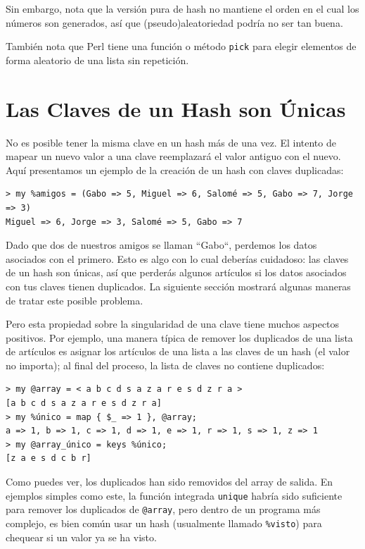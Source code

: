 Sin embargo, nota que la versión pura de hash no mantiene el orden
en el cual los números son generados, así que (pseudo)aleatoriedad
podría no ser tan buena.

También nota que Perl tiene una función o método {\tt pick}
para elegir elementos de forma aleatorio de una lista sin 
repetición.


\section{Las Claves de un Hash son Únicas}

No es posible tener la misma clave en un hash más de una vez.
El intento de mapear un nuevo valor a una clave reemplazará el
valor antiguo con el nuevo. Aquí presentamos un ejemplo de la
creación de un hash con claves duplicadas:

\begin{lstlisting}
> my %amigos = (Gabo => 5, Miguel => 6, Salomé => 5, Gabo => 7, Jorge => 3)
Miguel => 6, Jorge => 3, Salomé => 5, Gabo => 7
\end{lstlisting}

Dado que dos de nuestros amigos se llaman ``Gabo``,  perdemos los
datos asociados con el primero. Esto es algo con lo cual deberías
cuidadoso: las claves de un hash son únicas, así que perderás algunos
artículos si los datos asociados con tus claves tienen duplicados. 
La siguiente sección mostrará algunas maneras de tratar este posible 
problema.

Pero esta propiedad sobre la singularidad de una clave tiene muchos
aspectos positivos. Por ejemplo, una manera típica de remover los duplicados
de una lista de artículos es asignar los artículos de una lista a las
claves de un hash (el valor no importa); al final del proceso, 
la lista de claves no contiene duplicados:

\begin{lstlisting}
> my @array = < a b c d s a z a r e s d z r a >
[a b c d s a z a r e s d z r a]
> my %único = map { $_ => 1 }, @array;
a => 1, b => 1, c => 1, d => 1, e => 1, r => 1, s => 1, z => 1
> my @array_único = keys %único;
[z a e s d c b r]
\end{lstlisting}

Como puedes ver, los duplicados han sido removidos del 
array de salida. En ejemplos simples como este, la función
integrada {\tt unique} habría sido suficiente para remover los
duplicados de \verb|@array|, pero dentro de un programa más
complejo, es bien común usar un hash (usualmente llamado \verb|%visto|)
para chequear si un valor ya se ha visto.

